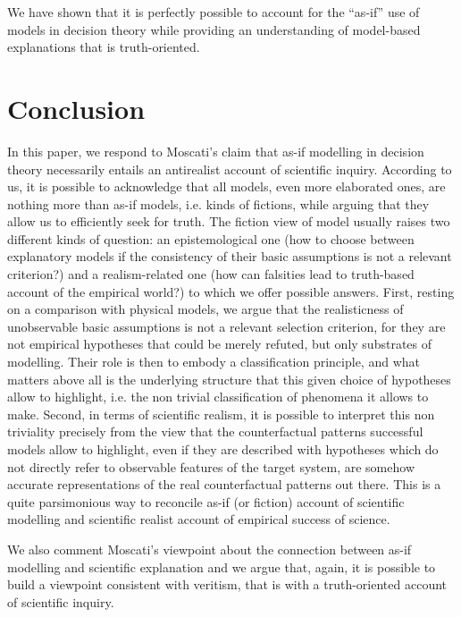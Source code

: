 \documentclass[a4paper,11pt]{article}
\theoremstyle{definition}
\begin{document}
We have shown that it is perfectly possible to account for the ``as-if'' use of models in decision theory while providing an understanding of model-based explanations that is truth-oriented.

\section{Conclusion}
In this paper, we respond to Moscati's claim that as-if modelling in decision theory necessarily entails an antirealist account of scientific inquiry. According to us, it is possible to acknowledge that all models, even more elaborated ones, are nothing more than as-if models, i.e. kinds of fictions, while arguing that they allow us to efficiently seek for truth. The fiction view of model usually raises two different kinds of question: an epistemological one (how to choose between explanatory models if the consistency of their basic assumptions is not a relevant criterion?) and a realism-related one (how can falsities lead to truth-based account of the empirical world?) to which we offer possible answers. First, resting on a comparison with physical models, we argue that the realisticness of unobservable basic assumptions is not a relevant selection criterion, for they are not empirical hypotheses that could be merely refuted, but only substrates of modelling. Their role is then to embody a classification principle, and what matters above all is the underlying structure that this given choice of hypotheses allow to highlight, i.e. the non trivial classification of phenomena it allows to make. Second, in terms of scientific realism, it is possible to interpret this non triviality precisely from the view that the counterfactual patterns successful models allow to highlight, even if they are described with hypotheses which do not directly refer to observable features of the target system, are somehow accurate representations of the real counterfactual patterns out there. This is a quite parsimonious way to reconcile as-if (or fiction) account of scientific modelling and scientific realist account of empirical success of science. 


We also comment Moscati's viewpoint about the connection between as-if modelling and scientific explanation and we argue that, again, it is possible to build a viewpoint consistent with veritism, that is with a truth-oriented account of scientific inquiry. 




 

\end{document}
